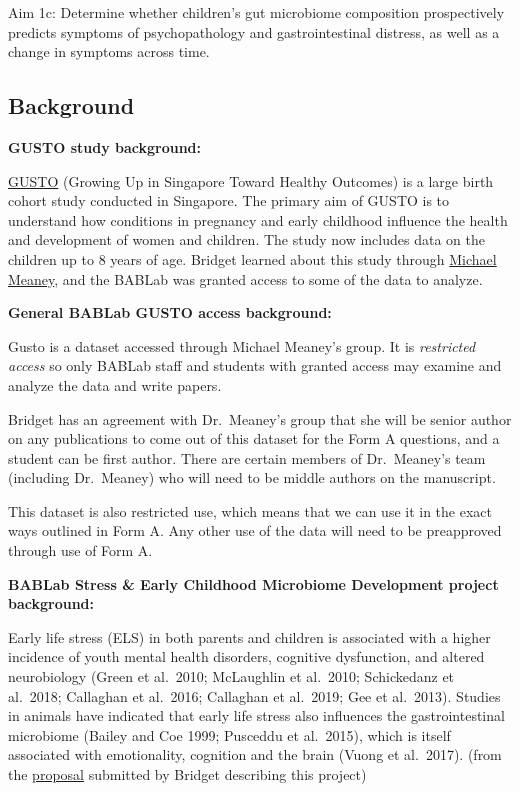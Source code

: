\documentclass[
]{book}
\begin{document}
Aim 1c: Determine whether children's gut microbiome composition prospectively predicts symptoms of psychopathology and gastrointestinal distress, as well as a change in symptoms across time.

\hypertarget{background}{%
\subsection{Background}\label{background}}

\textbf{GUSTO study background:}

\href{http://www.gusto.sg/}{GUSTO} (Growing Up in Singapore Toward Healthy Outcomes) is a large birth cohort study conducted in Singapore. The primary aim of GUSTO is to understand how conditions in pregnancy and early childhood influence the health and development of women and children. The study now includes data on the children up to 8 years of age. Bridget learned about this study through \href{https://douglas.research.mcgill.ca/michael-meaney}{Michael Meaney}, and the BABLab was granted access to some of the data to analyze.

\textbf{General BABLab GUSTO access background:}

Gusto is a dataset accessed through Michael Meaney's group. It is \emph{restricted access} so only BABLab staff and students with granted access may examine and analyze the data and write papers.

Bridget has an agreement with Dr.~Meaney's group that she will be senior author on any publications to come out of this dataset for the Form A questions, and a student can be first author. There are certain members of Dr.~Meaney's team (including Dr.~Meaney) who will need to be middle authors on the manuscript.

This dataset is also restricted use, which means that we can use it in the exact ways outlined in Form A. Any other use of the data will need to be preapproved through use of Form A.

\textbf{BABLab Stress \& Early Childhood Microbiome Development project background:}

Early life stress (ELS) in both parents and children is associated with a higher incidence of youth mental health disorders, cognitive dysfunction, and altered neurobiology (Green et al.~2010; McLaughlin et al.~2010; Schickedanz et al.~2018; Callaghan et al.~2016; Callaghan et al.~2019; Gee et al.~2013). Studies in animals have indicated that early life stress also influences the gastrointestinal microbiome (Bailey and Coe 1999; Pusceddu et al.~2015), which is itself associated with emotionality, cognition and the brain (Vuong et al.~2017). (from the \href{https://ucla.app.box.com/file/740587024475}{proposal} submitted by Bridget describing this project)
\end{document}
